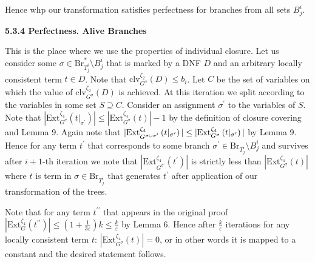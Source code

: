 \documentclass[10pt,a4paper]{article}
\begin{document}
Hence whp our transformation satisfies perfectness for branches from all sets $B^{i}_{j}$.\par






\par\medskip\noindent\textbf{
5.3.4 Perfectness. Alive Branches}\par




This is the place where we use the properties of individual closure. Let us consider some $\sigma\in\mathrm{Br}^{*}_{T^{i}_{j}}\setminus B^{i}_{j}$ that is marked by a DNF $D$ and an arbitrary locally consistent term $t\in D$. Note that $\mathrm{clv}_{G^{\sigma}}^{\zeta_{2}}\left(D\right)\leq b_{i}$. Let $C$ be the set of variables on which the value
of $\mathrm{clv}_{G^{\sigma}}^{\zeta_{2}}\left(D\right)$ is achieved. At this iteration we split according to the variables in
some set $S\supseteq C$. Consider an assignment $\sigma^{\prime}$ to the variables
of $S$. Note that $|\mathrm{Ext}_{G^{\sigma}}^{\zeta_{4}}\left(t|_{\sigma^{\prime}}\right)|\leq|%
\mathrm{Ext}_{G^{\sigma}}^{\zeta_{4}}\left(t\right)|-1$ by the
definition of closure covering and Lemma 9. Again note that
$|\mathrm{Ext}_{G^{\sigma\cup\sigma^{\prime}}}^{\zeta_{4}}\left(t|_{\sigma^{%
\prime}}\right)|\leq|\mathrm{Ext}_{G^{\sigma}}^{\zeta_{4}}\left(t|_{\sigma^{%
\prime}}\right)|$ by
Lemma 9. Hence for any term $t^{\prime}$ that corresponds to some branch $\sigma^{\prime}\in\mathrm{Br}_{T^{i}_{j}}\setminus B^{i}_{j}$ and survives after $i+1$-th iteration we note that
$|\mathrm{Ext}_{G^{\sigma^{\prime}}}^{\zeta_{4}}\left(t^{\prime}\right)|$ is strictly less than $|\mathrm{Ext}_{G^{\sigma}}^{\zeta_{4}}\left(t\right)|$ where $t$ is
term in $\sigma\in\mathrm{Br}_{T^{i}_{j}}$ that generates $t^{\prime}$ after application of our transformation of the trees.\par




Note that for any term $t^{\prime\prime}$ that appears in the original proof
$|\mathrm{Ext}_{G}^{\zeta_{4}}\left(t^{\prime\prime}\right)|\leq\left(1+\frac{1%
}{3\varepsilon}\right)k\leq\frac{k}{\varepsilon}$ by
Lemma 6. Hence after $\frac{k}{\varepsilon}$ iterations for any locally consistent
term $t$: $|\mathrm{Ext}_{G^{\sigma}}^{\zeta_{4}}\left(t\right)|=0$, or in other words it is mapped to a constant and the
desired statement follows.\par
\end{document}
